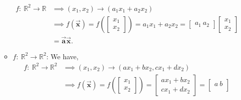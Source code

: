 \documentclass{report}
\begin{document}
\begin{itemize}
\begin{itemize}
                          \begin{align*}
                              f:\ \mathbb{R}^{2} \to \mathbb{R} &\implies (x_{1}, x_{2}) \to (a_{1}x_{1} + a_{2}x_{2}) \\
                                                                &\implies f(\vec{\mathbf{x}}) = f\left( \begin{bmatrix}
                                      x_{1} \\ x_{2}
                                  \end{bmatrix}\right) = a_{1}x_{1} + a_{2}x_{2} = \begin{bmatrix}
                                  a_{1}\ a_{2}
                              \end{bmatrix}
                              \begin{bmatrix}
                                  x_{1} \\ x_{2}
                              \end{bmatrix} \\
                                                                &=\vec{\mathbf{a}}\vec{\mathbf{x}}
                          .\end{align*}
                      \item $f:\ \mathbb{R}^{2} \to \mathbb{R}^{2}$: We have,
                          \begin{align*}
                              f:\ \mathbb{R}^{2} \to \mathbb{R}^{2} &\implies (x_{1}, x_{2}) \to (ax_{1}+ bx_{2}, cx_{1} + dx_{2}) \\
                                                                    &\implies f(\vec{\mathbf{x}}) = f\left( \begin{bmatrix}
                                                                        x_{1} \\ x_{2}
                                                                    \end{bmatrix}\right) = \begin{bmatrix}
                                                                        ax_{1} + bx_{2} \\
                                                                        cx_{1} + dx_{2}
                                                                    \end{bmatrix} = \begin{bmatrix}
                                                                        a\ b \\

\end{bmatrix}
\end{align*}
\end{itemize}
\end{itemize}
\end{document}
